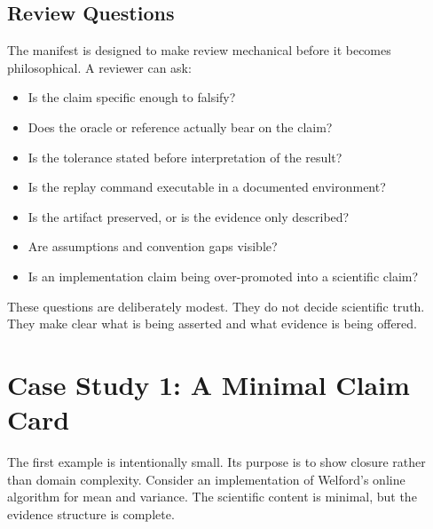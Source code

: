 \documentclass[10pt,twoside]{article}
\begin{document}
\subsection{Review Questions}

The manifest is designed to make review mechanical before it becomes
philosophical. A reviewer can ask:

\begin{itemize}[leftmargin=*]
  \item Is the claim specific enough to falsify?
  \item Does the oracle or reference actually bear on the claim?
  \item Is the tolerance stated before interpretation of the result?
  \item Is the replay command executable in a documented environment?
  \item Is the artifact preserved, or is the evidence only described?
  \item Are assumptions and convention gaps visible?
  \item Is an implementation claim being over-promoted into a scientific claim?
\end{itemize}

These questions are deliberately modest. They do not decide scientific truth.
They make clear what is being asserted and what evidence is being offered.

\section{Case Study 1: A Minimal Claim Card}

The first example is intentionally small. Its purpose is to show closure rather
than domain complexity. Consider an implementation of Welford's online
algorithm for mean and variance. The scientific content is minimal, but the
evidence structure is complete.
\end{document}
